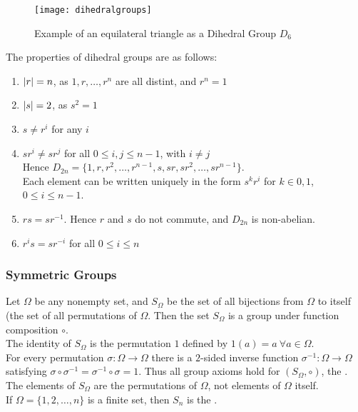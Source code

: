\begin{figure}[H]
\centering
\texttt{[image: dihedralgroups]}
\caption{Example of an equilateral triangle as a Dihedral Group $D_6$}
\end{figure}

\begin{remark}
The properties of dihedral groups are as follows:
\begin{enumerate}[label=(\roman*)]
\setlength{\itemsep}{0pt}
\item $\left\lvert r\right\rvert=n$, as $1, r, \ldots, r^n$ are all distint, and $r^n = 1$
\item $\left\lvert s\right\rvert=2$, as $s^2 = 1$
\item $s \neq r^i$ for any $i$
\item $sr^i \neq sr^j$ for all $0 \leq i, j \leq n-1$, with $i \neq j$\\
Hence $D_{2n} = \{1,r,r^2,\ldots, r^{n-1}, s, sr, sr^2, \ldots, sr^{n-1}\}$.\\
Each element can be written uniquely in the form $s^k r^i$ for $k \in {0,1}$, $0\leq i \leq n-1$.
\item $rs=sr^{-1}$. Hence $r$ and $s$ do not commute, and $D_{2n}$ is non-abelian.
\item $r^i s = sr^{-i}$ for all $0\leq i \leq n$
\end{enumerate}
\end{remark}

\subsubsection{Symmetric Groups}

\begin{definition}
Let $\Omega$ be any nonempty set, and $S_{\Omega}$ be the set of all bijections from $\Omega$ to itself (the set of all permutations of $\Omega$. Then the set $S_{\Omega}$ is a group under function composition $\circ$.\\
The identity of $S_{\Omega}$ is the permutation $1$ defined by $1(a)=a \ \forall a\in \Omega$.\\
For every permutation $\sigma: \Omega \rightarrow \Omega$ there is a $2$-sided inverse function $\sigma^{-1}: \Omega \rightarrow \Omega$ satisfying $\sigma \circ \sigma^{-1} = \sigma^{-1} \circ \sigma = 1$. Thus all group axioms hold for $(S_{\Omega}, \circ)$, the .\\
The elements of $S_{\Omega}$ are the permutations of $\Omega$, not elements of $\Omega$ itself.\\
If $\Omega = \{1,2,\ldots, n\}$ is a finite set, then $S_n$ is the .
\end{definition}

